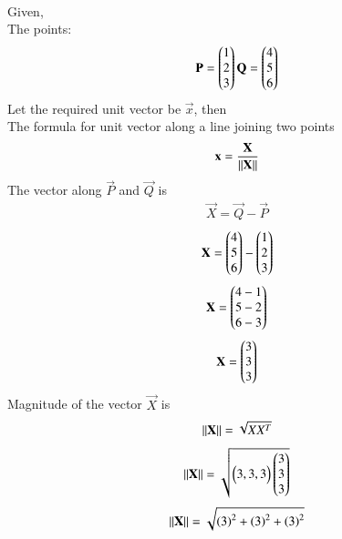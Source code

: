 \documentclass[journal]{IEEEtran}
\begin{document}
         \solution \\
         Given,\\
         The points: 
         \begin{align}
             \mathbf{P}=\begin{pmatrix}1\\2\\3\end{pmatrix} \mathbf{Q}=\begin{pmatrix}4\\5\\6\end{pmatrix}
         \end{align}
         Let the required unit vector be $\vec{x}$, then\\ 
         The formula for unit vector along a line joining two points
         \begin{align}
             \mathbf{{x}}=\frac{\mathbf{X}}{\left\lVert\mathbf{X}\right\rVert}
         \end{align}
         The vector along $\vec{P}$ and $\vec{Q}$ is\\
         \begin{align}
             \vec{X}=\vec{Q}-\vec{P}
         \end{align}
         \begin{align}
             \mathbf{X}=\begin{pmatrix}4\\5\\6\end{pmatrix}-\begin{pmatrix}1\\2\\3\end{pmatrix}
         \end{align}
         \begin{align}
             \mathbf{X}=\begin{pmatrix}4-1\\5-2\\6-3\end{pmatrix}
         \end{align}
         \begin{align}
             \mathbf{X}=\begin{pmatrix}3\\3\\3\end{pmatrix}
         \end{align}
         Magnitude of the vector $\vec{X}$ is\\
         \begin{align}
             \left\lVert\mathbf{X}\right\rVert=\sqrt{XX^T}
         \end{align}
         \begin{align}
             \left\lVert\mathbf{X}\right\rVert=\sqrt{\begin{pmatrix}3,3,3\end{pmatrix}\begin{pmatrix}3\\3\\3\end{pmatrix}}
         \end{align}
         \begin{align}
             \left\lVert\mathbf{X}\right\rVert=\sqrt{\left(3\right)^2+\left(3\right)^2+\left(3\right)^2}
         \end{align}
\end{document}
